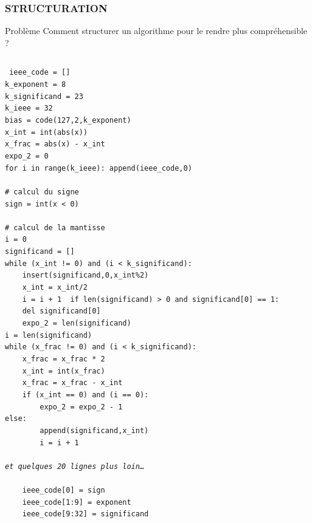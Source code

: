 \begin{frame}
\frametitle{\uppercase{Structuration}}
\begin{block}{Problème}
Comment structurer un algorithme pour le rendre plus compréhensible ?
\end{block}
\begin{columns}[T]
\column{5.25cm}\tiny\tt
    ieee\_code = []\\
    k\_exponent = 8\\
    k\_significand = 23\\
    k\_ieee = 32\\
    bias = code(127,2,k\_exponent)\\
    x\_int = int(abs(x))\\
    x\_frac = abs(x) - x\_int\\
    expo\_2 = 0\\
    for i in range(k\_ieee): append(ieee\_code,0)\\
\mbox{}\\
    \# calcul du signe\\
    sign = int(x < 0)\\
\mbox{}\\ 
    \# calcul de la mantisse\\
    i = 0\\
    significand = []\\
    while (x\_int != 0) and (i < k\_significand):\\
\ \ \ \ insert(significand,0,x\_int\%2)\\
\ \ \ \ x\_int = x\_int/2\\
\ \ \ \ i = i + 1
\column{5.25cm}\tiny\tt
    if len(significand) > 0 and significand[0] == 1:\\
\ \ \ \ del significand[0]\\
\ \ \ \ expo\_2 = len(significand)\\
    i = len(significand)\\
    while (x\_frac != 0) and (i < k\_significand):\\
\ \ \ \ x\_frac = x\_frac * 2\\
\ \ \ \ x\_int = int(x\_frac)\\
\ \ \ \ x\_frac = x\_frac - x\_int\\
\ \ \ \ if (x\_int == 0) and (i == 0):\\
\ \ \ \ \ \ \ \ expo\_2 = expo\_2 - 1\\
        else:\\
\ \ \ \ \ \ \ \ append(significand,x\_int)\\
\ \ \ \ \ \ \ \ i = i + 1\\
\mbox{}\\
\alert{\em et quelques 20 lignes plus loin\ldots}\\
\mbox{}\\
\ \ \ \ ieee\_code[0] = sign\\
\ \ \ \ ieee\_code[1:9] = exponent\\
\ \ \ \ ieee\_code[9:32] = significand	    
\end{columns}
\end{frame}
\note{}

